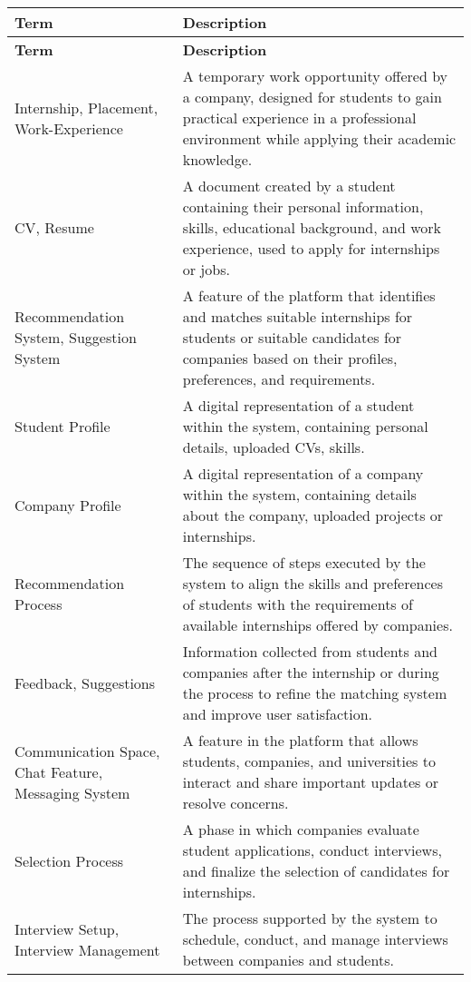 \begin{longtable}{|p{}|p{}|}
    \hline
    \textbf{Term} & \textbf{Description} \\
    \hline
    \endfirsthead
    \hline
    \textbf{Term} & \textbf{Description} \\
    \hline
    \endhead
    \hline
    \endfoot
    
    Internship, Placement, Work-Experience & A temporary work opportunity offered by a company, designed for students to gain practical experience in a professional environment while applying their academic knowledge. \\
    \hline
    CV, Resume & A document created by a student containing their personal information, skills, educational background, and work experience, used to apply for internships or jobs. \\
    \hline
    Recommendation System, Suggestion System & A feature of the platform that identifies and matches suitable internships for students or suitable candidates for companies based on their profiles, preferences, and requirements. \\
    \hline
    Student Profile & A digital representation of a student within the system, containing personal details, uploaded CVs, skills. \\
    \hline
    Company Profile & A digital representation of a company within the system, containing details about the company, uploaded projects or internships. \\
    \hline
    Recommendation Process & The sequence of steps executed by the system to align the skills and preferences of students with the requirements of available internships offered by companies. \\
    \hline
    Feedback, Suggestions & Information collected from students and companies after the internship or during the process to refine the matching system and improve user satisfaction. \\
    \hline
    Communication Space, Chat Feature, Messaging System & A feature in the platform that allows students, companies, and universities to interact and share important updates or resolve concerns. \\
    \hline
    Selection Process & A phase in which companies evaluate student applications, conduct interviews, and finalize the selection of candidates for internships. \\
    \hline
    Interview Setup, Interview Management & The process supported by the system to schedule, conduct, and manage interviews between companies and students. \\

\end{longtable}
